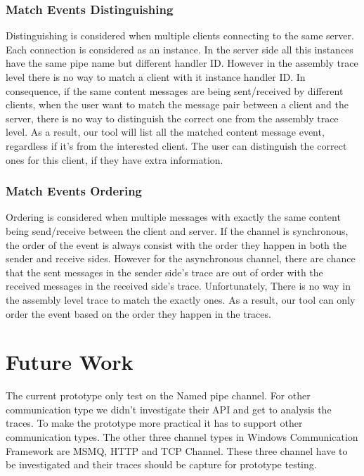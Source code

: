 \documentclass[paper=a4, fontsize=11pt]{scrartcl}
\numberwithin{equation}{section}		%
\numberwithin{figure}{section}			%
\numberwithin{table}{section}				%
\begin{document}
\subsubsection{Match Events Distinguishing}
Distinguishing is considered when multiple clients connecting to the same server. Each connection is considered as an instance. In the server side all this instances have the same pipe name but different handler ID. However in the assembly trace level there is no way to match a client with it instance handler ID. In consequence, if the same content messages are being sent/received by different clients, when the user want to match the message pair between a client and the server, there is no way to distinguish the correct one from the assembly trace level. As a result, our tool will list all the matched content message event, regardless if it's from the interested client. The user can distinguish the correct ones for this client, if they have extra information.

\subsubsection{Match Events Ordering}
Ordering is considered when multiple messages with exactly the same content being send/receive between the client and server. If the channel is synchronous, the order of the event is always consist with the order they happen in both the sender and receive sides. However for the asynchronous channel, there are chance that the sent messages in the sender side's trace are out of order with the received messages in the received side's trace. Unfortunately, There is no way in the assembly level trace to match the exactly ones. As a result, our tool can only order the event based on the order they happen in the traces.
\section{Future Work}
The current prototype only test on the Named pipe channel. For other communication type we didn't investigate their API and get to analysis the traces. To make the prototype more practical it has to support other communication types. The other three channel types in Windows Communication Framework are MSMQ, HTTP and TCP Channel. These three channel have to be investigated and their traces should be capture for prototype testing.


 


\end{document}
